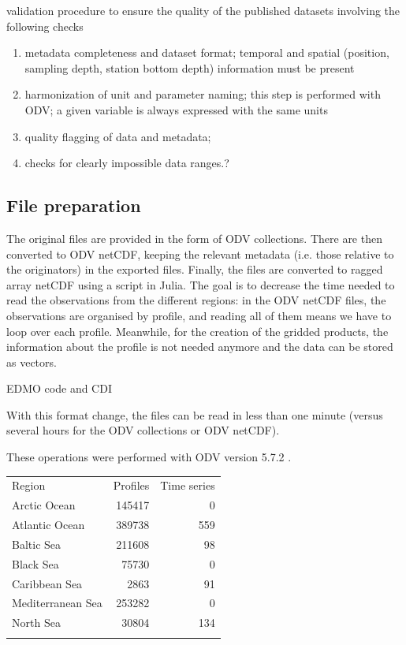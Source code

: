\documentclass[essd, manuscript]{copernicus}
\begin{document}
validation procedure to ensure the quality of the published datasets \citep{Barth2015,Lipizer2021}
involving the following checks
\begin{enumerate}
\item metadata completeness and dataset format; temporal and spatial (position, sampling depth, station bottom depth) information
must be present
\item harmonization of unit and parameter naming; this step is performed with ODV; a given variable is always expressed with the same units
\item quality flagging of data and metadata;
\item checks for clearly impossible data ranges.?
\end{enumerate} 


\subsection{File preparation}

The original files are provided in the form of ODV \citep[Ocean Data View,][]{SCHLITZER2002} collections. There are then converted to ODV netCDF, keeping the relevant metadata (i.e. those relative to the originators) in the exported files. Finally, the files are converted to ragged array netCDF using a script in Julia. The goal is to decrease the time needed to read the observations from the different regions: in the ODV netCDF files, the observations are organised by profile, and reading all of them means we have to loop over each profile. Meanwhile, for the creation of the gridded products, the information about the profile is not needed anymore and the data can be stored as vectors.

EDMO code and CDI \citep{Schaap2010}

With this format change, the files can be read in less than one minute (versus several hours for the ODV collections or ODV netCDF).

These operations were performed with ODV version 5.7.2 \citep{Schlitzer2024}.

\begin{table}
\begin{tabular}{lrr}
\tophline
Region			& Profiles		& Time series	\\
\middlehline
Arctic Ocean		& 145417			& 0				\\
Atlantic	 Ocean	& 389738			& 559			\\
Baltic Sea		& 211608			& 98				\\
Black Sea		& 75730			& 0				\\
Caribbean Sea	& 2863			& 91				\\
Mediterranean Sea & 253282		& 0				\\
North Sea		& 30804			& 134			\\
\bottomhline
\end{tabular}
\end{table}
 
\end{document}
